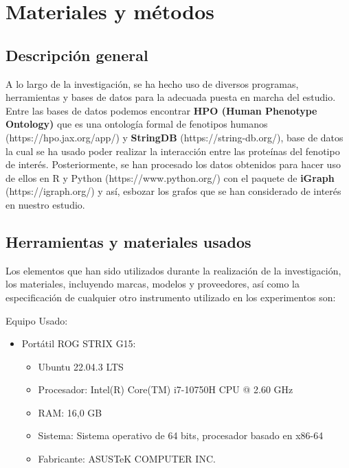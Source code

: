 \section{Materiales y métodos}

\subsection{Descripción general}

A lo largo de la investigación, se ha hecho uso de diversos programas, herramientas y bases de datos para la adecuada puesta en marcha del estudio. Entre las bases de datos podemos encontrar \textbf{HPO (Human Phenotype Ontology)} que es una ontología formal de fenotipos humanos (https://hpo.jax.org/app/) y \textbf{StringDB} (https://string-db.org/), base de datos la cual se ha usado poder realizar la interacción entre las proteínas del fenotipo de interés. Posteriormente, se han procesado los datos obtenidos para hacer uso de ellos en R y Python (https://www.python.org/) con el paquete de \textbf{iGraph} (https://igraph.org/) y así, esbozar los grafos que se han considerado de interés en nuestro estudio.

\subsection{Herramientas y materiales usados}

Los elementos que han sido utilizados durante la realización de la investigación, los materiales, incluyendo marcas, modelos y proveedores, así como la especificación de cualquier otro instrumento utilizado en los experimentos son:

Equipo Usado:
\begin{itemize}
	\item Portátil ROG STRIX G15:
	\begin{itemize}
		\item Ubuntu 22.04.3 LTS %
		\item Procesador: Intel(R) Core(TM) i7-10750H CPU @ 2.60 GHz
		\item RAM: 16,0 GB
		\item Sistema: Sistema operativo de 64 bits, procesador basado en x86-64
		\item Fabricante: ASUSTeK COMPUTER INC.
	\end{itemize}
\end{itemize}

